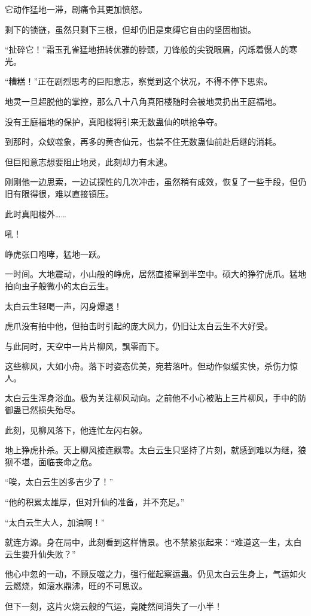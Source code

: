 \begin{this_body}
它动作猛地一滞，剧痛令其更加愤怒。

剩下的锁链，虽然只剩下三根，但却仍旧是束缚它自由的坚固枷锁。

“扯碎它！”霜玉孔雀猛地扭转优雅的脖颈，刀锋般的尖锐眼眉，闪烁着慑人的寒光。

“糟糕！”正在剧烈思考的巨阳意志，察觉到这个状况，不得不停下思索。

地灵一旦超脱他的掌控，那么八十八角真阳楼随时会被地灵扔出王庭福地。

没有王庭福地的保护，真阳楼将引来无数蛊仙的哄抢争夺。

到那时，众蚁噬象，再多的黄杏仙元，也禁不住无数蛊仙前赴后继的消耗。

但巨阳意志想要阻止地灵，此刻却力有未逮。

刚刚他一边思索，一边试探性的几次冲击，虽然稍有成效，恢复了一些手段，但仍旧有限得很，难以直接镇压。

此时真阳楼外……

吼！

峥虎张口咆哮，猛地一跃。

一时间。大地震动，小山般的峥虎，居然直接窜到半空中。硕大的狰狞虎爪。猛地拍向虫子般微小的太白云生。

太白云生轻喝一声，闪身爆退！

虎爪没有拍中他，但拍击时引起的庞大风力，仍旧让太白云生不大好受。

与此同时，天空中一片片柳风，飘零而下。

这些柳风，大如小舟。落下时姿态优美，宛若落叶。但动作似缓实快，杀伤力惊人。

太白云生浑身浴血。极为关注柳风动向。之前他不小心被贴上三片柳风，手中的防御蛊已然损失殆尽。

此刻，见柳风落下，他连忙左闪右躲。

地上狰虎扑杀。天上柳风接连飘零。太白云生只坚持了片刻，就感到难以为继，狼狈不堪，面临丧命之危。

“唉，太白云生凶多吉少了！”

“他的积累太雄厚，但对升仙的准备，并不充足。”

“太白云生大人，加油啊！”

就连方源。身在局中，此刻看到这样情景。也不禁紧张起来：“难道这一生，太白云生要升仙失败？”

他心中忽的一动，不顾反噬之力，强行催起察运蛊。仍见太白云生身上，气运如火云燃烧，如滚水鼎沸，旺的不可思议。

但下一刻，这片火烧云般的气运，竟陡然间消失了一小半！


\end{this_body}
